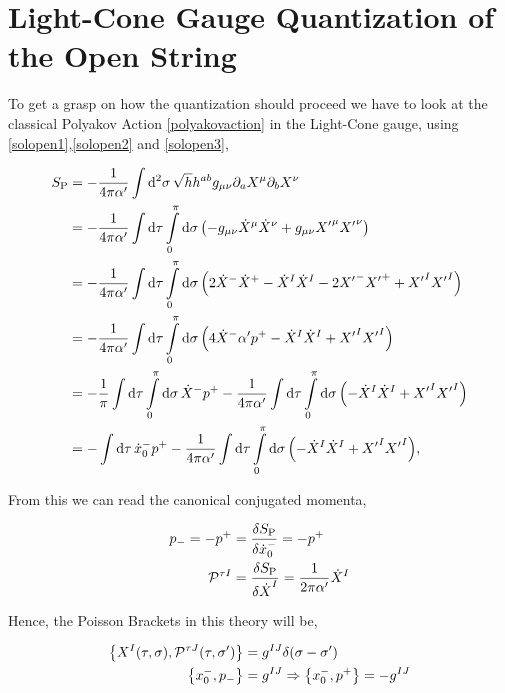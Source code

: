 \section{Light-Cone Gauge Quantization of the Open String}
\label{app-openqnt}

To get a grasp on how the quantization should proceed we have to look at the classical Polyakov Action \ref{polyakovaction} in the Light-Cone gauge, using \ref{solopen1},\ref{solopen2} and \ref{solopen3},

\begin{align*}
    S_{\textnormal{P}}&=-\frac{1}{4\pi\alpha'}\int\dd[2]{\sigma}\sqrt{h}h^{ab}g_{\mu\nu}\partial_a X^\mu \partial_b X^\nu\\
    &=-\frac{1}{4\pi\alpha'}\int\dd{\tau}\int\limits_0^\pi\dd{\sigma}\qty(-g_{\mu\nu}{\dot X}^\mu {\dot X}^\nu+g_{\mu\nu}{X'}^\mu { X'}^\nu)\\
    &=-\frac{1}{4\pi\alpha'}\int\dd{\tau}\int\limits_0^\pi\dd{\sigma}\qty(2{\dot X}^- {\dot X}^+-{\dot X}^I{\dot X}^I-2{X'}^- { X'}^++{X'}^I{X'}^I)\\
    &=-\frac{1}{4\pi\alpha'}\int\dd{\tau}\int\limits_0^\pi\dd{\sigma}\qty(4{\dot X}^-\alpha'p^+-{\dot X}^I{\dot X}^I+{X'}^I{X'}^I)\\
    &=-\frac{1}{\pi}\int\dd{\tau}\int\limits_0^\pi\dd{\sigma}{\dot X}^-p^+-\frac{1}{4\pi\alpha'}\int\dd{\tau}\int\limits_0^\pi\dd{\sigma}\qty(-{\dot X}^I{\dot X}^I+{X'}^I{X'}^I)\\
    &=-\int\dd{\tau}{\dot x_0}^-p^+-\frac{1}{4\pi\alpha'}\int\dd{\tau}\int\limits_0^\pi\dd{\sigma}\qty(-{\dot X}^I{\dot X}^I+{X'}^I{X'}^I),
\end{align*}

From this we can read the canonical conjugated momenta,

\begin{align*}
    p_-=-p^+&=\fdv{S_{\textnormal{P}}}{{\dot x}_0^-}=-p^+\\
    \mathcal P^{\tau I}&=\fdv{S_{\textnormal{P}}}{{\dot X}^I}=\frac{1}{2\pi\alpha'}{\dot X}^I
\end{align*}

Hence, the Poisson Brackets in this theory will be,

\begin{align*}
    \acomm{X^I\qty(\tau,\sigma)}{\mathcal P^{\tau J}\qty(\tau,\sigma')}&=g^{IJ}\delta\qty(\sigma-\sigma')\\
    \acomm{x_0^-}{p_-}&=g^{IJ}\Rightarrow\acomm{x_0^-}{p^+}=-g^{IJ}
\end{align*}

